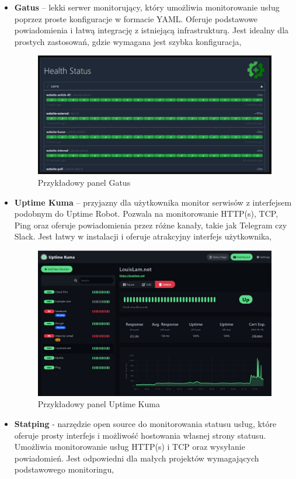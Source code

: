 \documentclass{article}
\begin{document}
\begin{itemize}
    \item \textbf{Gatus} – lekki serwer monitorujący, który umożliwia monitorowanie usług poprzez proste konfiguracje w formacie YAML. Oferuje podstawowe powiadomienia i łatwą integrację z istniejącą infrastrukturą. Jest idealny dla prostych zastosowań, gdzie wymagana jest szybka konfiguracja,

\begin{figure}[H]
    \centering
    \includegraphics[width=0.5\linewidth]{przykladGatus.png}
    \caption{Przykładowy panel Gatus}
    \label{fig:enter-label}
\end{figure}

    \item \textbf{Uptime Kuma} – przyjazny dla użytkownika monitor serwisów z interfejsem podobnym do Uptime Robot. Pozwala na monitorowanie HTTP(s), TCP, Ping oraz oferuje powiadomienia przez różne kanały, takie jak Telegram czy Slack. Jest łatwy w instalacji i oferuje atrakcyjny interfejs użytkownika,

\begin{figure}[H]
    \centering
    \includegraphics[width=0.5\linewidth]{przykladKuma.png}
    \caption{Przykładowy panel Uptime Kuma}
    \label{fig:enter-label}
\end{figure}

    \item \textbf{Statping} - narzędzie open source do monitorowania statusu usług, które oferuje prosty interfejs i możliwość hostowania własnej strony statusu. Umożliwia monitorowanie usług HTTP(s) i TCP oraz wysyłanie powiadomień. Jest odpowiedni dla małych projektów wymagających podstawowego monitoringu,


\end{itemize}
\end{document}
